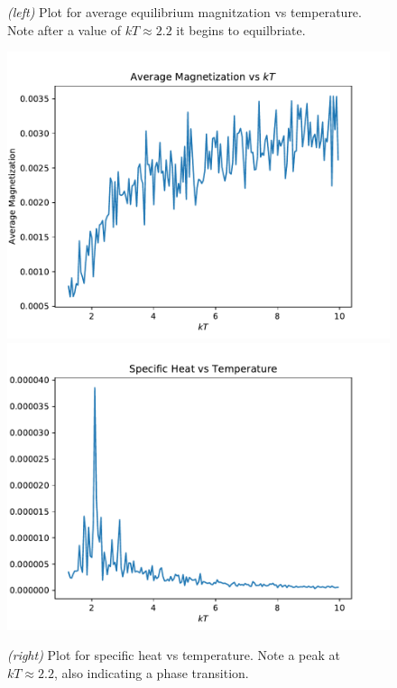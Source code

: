 \documentclass{article}
\begin{document}
\begin{figure}[H]
  \caption{\textit{(left)} Plot for average equilibrium magnitzation vs temperature.
  Note after a value of $kT \approx 2.2$ it begins to equilbriate.}
  \includegraphics[scale=0.35]{a_mags.pdf}
  \includegraphics[scale=0.35]{a_cv.pdf}
  \caption{\textit{(right)} Plot for specific heat vs temperature. Note a peak at
  $kT \approx 2.2$, also indicating a phase transition.}
\end{figure}
\end{document}
